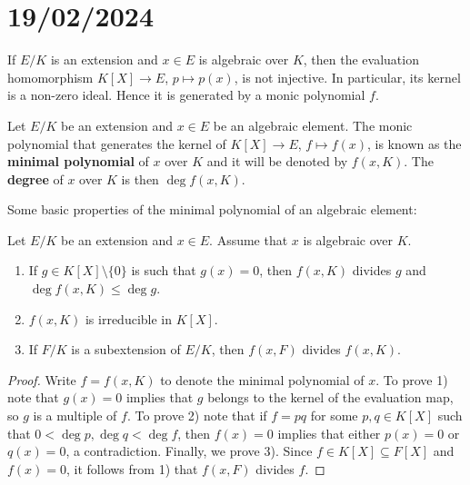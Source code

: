 \section{19/02/2024}

If $E/K$ is an extension and $x\in E$ is algebraic
over $K$, then the evaluation homomorphism 
$K[X]\to E$, $p\mapsto p(x)$, is not injective. In particular,
its kernel is a non-zero ideal. Hence 
it is generated by a monic polynomial $f$. 

\begin{definition}
	Let $E/K$ be an extension and $x\in E$ be an algebraic element.  The monic
	polynomial that generates the kernel of $K[X]\to E$, $f\mapsto f(x)$, is
	known as the \textbf{minimal polynomial} of $x$ over $K$ and it will be
	denoted by $f(x,K)$. The \textbf{degree} of $x$ over $K$ is then $\deg
	f(x,K)$. 
\end{definition}

Some basic properties of the minimal polynomial of an algebraic element:

\begin{proposition}
	Let $E/K$ be an extension and $x\in E$. Assume that $x$ is algebraic over $K$. 
	\begin{enumerate}
		\item If $g\in K[X]\setminus\{0\}$ is such that $g(x)=0$, then $f(x,K)$ divides $g$ and  
		$\deg f(x,K)\leq\deg g$. 
		\item $f(x,K)$ is irreducible in $K[X]$.
		\item If $F/K$ is a subextension of $E/K$, then $f(x,F)$ divides
			$f(x,K)$. 
	\end{enumerate}
\end{proposition}

\begin{proof}
	Write $f=f(x,K)$ to denote the minimal polynomial of $x$. 
	To prove 1) note that $g(x)=0$ implies that	$g$ belongs to the kernel of
	the evaluation map, so $g$ is a multiple of $f$. To prove 2) 
	note that if $f=pq$ for some $p,q\in K[X]$ such that
	$0<\deg p,\deg q<\deg f$, then $f(x)=0$ implies that 
	either $p(x)=0$ or $q(x)=0$, a
	contradiction. Finally, we prove 3). Since $f\in K[X]\subseteq F[X]$ 
	and $f(x)=0$, it follows from 1) that $f(x,F)$ divides $f$. 
\end{proof}

